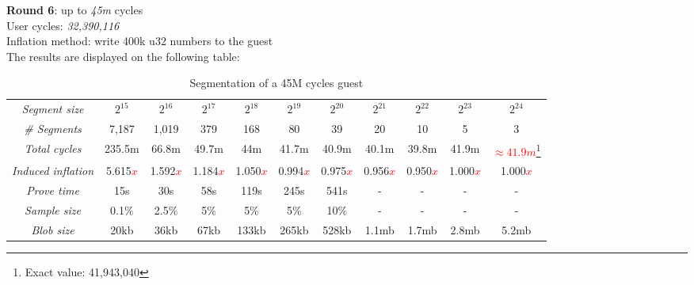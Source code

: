 \documentclass[a4paper, 10pt]{article}
\begin{document}
\par \noindent
\textbf{Round 6}: up to \textit{45m} cycles\\
User cycles: \textit{32,390,116}\\
Inflation method: write 400k u32 numbers to the guest\\
The results are displayed on the following table:
\begin{table}[H]
  	\begin{center}
    \label{tab:table7}
    \begin{minipage}{\textwidth}
    \begin{adjustbox}{width=\textwidth}
    \begin{tabular}{c|c|c|c|c|c|c|c|c|c|c}
	  \textit{Segment size} & $2^{15}$ & $2^{16}$ & $2^{17}$ & $2^{18}$ & $2^{19}$ & $2^{20}$ & $2^{21}$ & $2^{22}$ & $2^{23}$ & $2^{24}$\\
	  \textit{\# Segments} & 7,187 & 1,019 & 379 & 168 & 80 & 39 & 20 & 10 & 5 & 3\\
	  \textit{Total cycles} & 235.5m & 66.8m & 49.7m & 44m & 41.7m & 40.9m & 40.1m & 39.8m & 41.9m & \textcolor{red}{$\approx 41.9m$}\footnote{Exact value: 41,943,040}\\
	  \textit{Induced inflation} & 5.615\textcolor{red}{$x$} & 1.592\textcolor{red}{$x$} & 1.184\textcolor{red}{$x$} & 1.050\textcolor{red}{$x$} & 0.994\textcolor{red}{$x$} & 0.975\textcolor{red}{$x$} & 0.956\textcolor{red}{$x$} & 0.950\textcolor{red}{$x$} & 1.000\textcolor{red}{$x$} & 1.000\textcolor{red}{$x$}\\
	  \textit{Prove time} & 15s & 30s & 58s & 119s & 245s & 541s & - & - & - & -\\
	  \textit{Sample size} & 0.1\% & 2.5\% & 5\% & 5\% & 5\% & 10\% & - & - & - & -\\
	  \textit{Blob size} & 20kb & 36kb & 67kb & 133kb & 265kb & 528kb & 1.1mb & 1.7mb & 2.8mb & 5.2mb\\
   	\end{tabular}
   	\end{adjustbox}
   	\end{minipage}
    \caption{Segmentation of a 45M cycles guest}
  \end{center}
\end{table}
\end{document}
